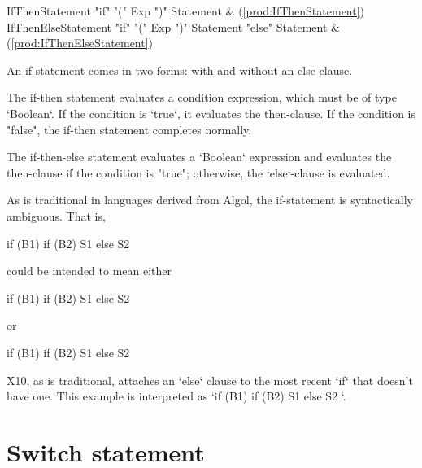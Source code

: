 \begin{bbgrammar}
     IfThenStatement \: \xcd"if" \xcd"(" Exp \xcd")" Statement & (\ref{prod:IfThenStatement}) \\
 IfThenElseStatement \: \xcd"if" \xcd"(" Exp \xcd")" Statement  \xcd"else" Statement  & (\ref{prod:IfThenElseStatement}) \\
\end{bbgrammar}

An if statement comes in two forms: with and without an else
clause.

The if-then statement evaluates a condition expression, which must be of type
\xcd`Boolean`. If the condition is \xcd`true`, it evaluates the then-clause.
If the condition is \xcd"false", the if-then statement completes normally.

The if-then-else statement evaluates a \xcd`Boolean` expression and 
evaluates the then-clause if the condition is
\xcd"true"; otherwise, the \xcd`else`-clause is evaluated.

As is traditional in languages derived from Algol, the if-statement is syntactically
ambiguous.  That is, 
\begin{xten}
if (B1) if (B2) S1 else S2
\end{xten}
could be intended to mean either 
\begin{xten}
if (B1) { if (B2) S1 else S2 }
\end{xten} 
or 
\begin{xten}
if (B1) {if (B2) S1} else S2
\end{xten}
X10, as is traditional, attaches an \xcd`else` clause to the most recent
\xcd`if` that doesn't have one.
This example is interpreted as 
\xcd`if (B1) { if (B2) S1 else S2 }`. 



\section{Switch statement}

